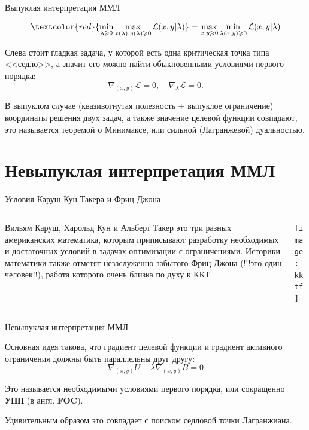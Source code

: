 \documentclass{beamer}
\begin{document}
\begin{frame}{Выпуклая интерпретация ММЛ}

$$ \textcolor{red}{\min_{\lambda \geqslant 0} \max_{x(\lambda),y(\lambda) \geqslant 0} \mathcal{L}(x,y | \lambda)} =  \max_{x,y \geqslant 0} \min_{\lambda(x,y) \geqslant 0} \mathcal{L}(x,y | \lambda) $$ 

Слева стоит гладкая задача, у которой есть одна критическая точка типа <<седло>>, а значит его можно найти обыкновенными условиями первого порядка:
$$ \nabla_{(x,y)} \mathcal{L} = 0, \quad \nabla_{\lambda} \mathcal{L} = 0.$$

В выпуклом случае (квазивогнутая полезность + выпуклое ограничение) координаты решения двух задач, а также значение целевой функции совпадают, это называется \alert{теоремой о Минимаксе}, или сильной (Лагранжевой) дуальностью.

\end{frame}

\section{Невыпуклая интерпретация ММЛ}

\begin{frame}{Условия Каруш-Кун-Такера и Фриц-Джона}

\begin{columns}
\begin{column}{0.5\textwidth}
   \alert{Вильям Каруш, Харольд Кун и Альберт Такер} это три разных американских математика, которым приписывают разработку необходимых и достаточных условий в задачах оптимизации с ограничениями. Историки математики также отметят незаслуженно забытого \alert{Фриц Джона} (!!!это один человек!!), работа которого очень близка по духу к ККТ.
\end{column}
\begin{column}{0.5\textwidth}  %
    \begin{center}
     \texttt{[image: kktf]}
     \end{center}
\end{column}
\end{columns}

\end{frame}

\begin{frame}{Невыпуклая интерпретация ММЛ}


Основная идея такова, что градиент целевой функции и градиент активного ограничения должны быть параллельны друг другу:
$$ \nabla_{(x,y)}U - \lambda \nabla_{(x,y)} B = 0$$

Это называется необходимыми условиями первого порядка, или сокращенно \textbf{УПП} (в англ. \textbf{FOC}). 

Удивительным образом это совпадает с поиском седловой точки Лагранжиана.

\end{frame}
\end{document}
